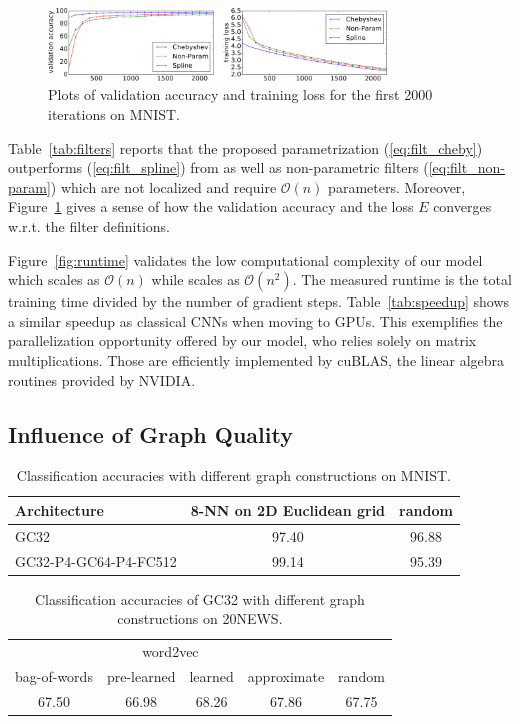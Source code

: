 \documentclass{article}
\newcommand{\bO}{\mathcal{O}}
\newcommand{\figref}[1]{Figure~\ref{fig:#1}}
\newcommand{\tabref}[1]{Table~\ref{tab:#1}}
\newcommand{\eqnref}[1]{(\ref{eq:#1})}
\begin{document}
\begin{figure}[t]
\centering
\includegraphics[width=0.8\textwidth]{images/training}
\caption{Plots of validation accuracy and training loss for the first 2000
iterations on MNIST.}
\label{fig:convergence}
\end{figure}

\tabref{filters} reports that the proposed parametrization \eqnref{filt_cheby}
outperforms \eqnref{filt_spline} from \cite{art:BrunaZarembaSzlamLeCun13DLgraphs} as well as non-parametric
filters \eqnref{filt_non-param} which are not localized and require $\bO(n)$
parameters. Moreover, \figref{convergence} gives a sense of how the validation
accuracy and the loss $E$ converges w.r.t. the filter definitions.

\figref{runtime} validates the low computational complexity of our model which
scales as $\bO(n)$ while \cite{art:BrunaZarembaSzlamLeCun13DLgraphs} scales as $\bO(n^2)$. The measured
runtime is the total training time divided by the number of gradient steps.
\tabref{speedup} shows a similar speedup as classical CNNs when moving to GPUs.
This exemplifies the parallelization opportunity offered by our model, who
relies solely on matrix multiplications. Those are efficiently implemented by
cuBLAS, the linear algebra routines provided by NVIDIA.

\subsection{Influence of Graph Quality} \label{sec:graph_quality}

\begin{table}[t]
\centering
\begin{tabular}{lcc} \toprule
Architecture & 8-NN on 2D Euclidean grid & random \\
\midrule
GC32 & 97.40 & 96.88 \\
GC32-P4-GC64-P4-FC512 & 99.14 & 95.39 \\
\bottomrule \end{tabular}
\caption{Classification accuracies with different graph constructions on MNIST.} 
\label{tab:mnist_quality}
\end{table}

\begin{table}[t] \centering
\begin{tabular}{ccccc} \toprule
& \multicolumn{2}{c}{word2vec} & & \\
bag-of-words & pre-learned & learned & approximate & random \\
\midrule
67.50 & 66.98 & 68.26 & 67.86 & 67.75 \\
\bottomrule \end{tabular}
\caption{Classification accuracies of GC32 with different graph constructions on 20NEWS.} 
\label{tab4b}
\label{tab:20news_quality}
\end{table}
\end{document}
